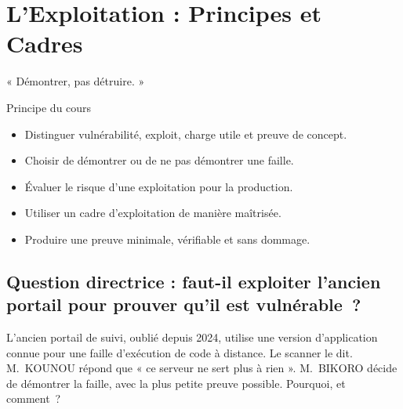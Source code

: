 
\chapter{L'Exploitation : Principes et Cadres}
\label{chap:exploitation}

\epigraph{%
    « Démontrer, pas détruire. »%
}{Principe du cours}


\begin{boxobjectifs}
\begin{itemize}
    \item Distinguer vulnérabilité, exploit, charge utile et preuve de
          concept.
    \item Choisir de démontrer ou de ne pas démontrer une faille.
    \item Évaluer le risque d'une exploitation pour la production.
    \item Utiliser un cadre d'exploitation de manière maîtrisée.
    \item Produire une preuve minimale, vérifiable et sans dommage.
\end{itemize}
\end{boxobjectifs}

\bigskip

\section*{Question directrice : faut-il exploiter l'ancien portail pour prouver qu'il est vulnérable~?}

L'ancien portail de suivi, oublié depuis 2024, utilise une version
d'application connue pour une faille d'exécution de code à distance. Le
scanner le dit. M.~KOUNOU répond que « ce serveur ne sert plus à rien ».
M.~BIKORO décide de démontrer la faille, avec la plus petite preuve
possible. Pourquoi, et comment~?

